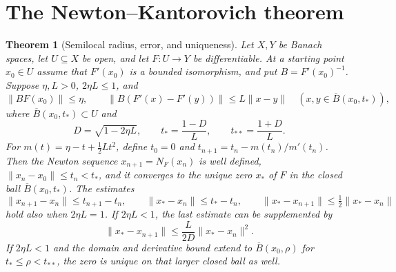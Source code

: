 \documentclass[11pt,oneside,openany]{book}
\theoremstyle{plain}
\newtheorem{theorem}{Theorem}[chapter]
\theoremstyle{definition}
\theoremstyle{remark}
\begin{document}
\section{The Newton--Kantorovich theorem}

\begin{theorem}[Semilocal radius, error, and uniqueness]\label{p206:W77}
Let \(X,Y\) be Banach spaces, let \(U\subseteq X\) be open, and
let \(F\colon U\to Y\) be differentiable. At a starting point
\(x_0\in U\) assume that \(F'(x_0)\) is a bounded isomorphism,
and put \(B=F'(x_0)^{-1}\). Suppose \(\eta,L>0\), \(2\eta L\le1\),
and
\[
 \|BF(x_0)\|\le\eta,\qquad
 \|B(F'(x)-F'(y))\|\le L\|x-y\|
 \quad (x,y\in\overline B(x_0,t_*)),
\]
where \(\overline B(x_0,t_*)\subset U\) and
\[
 D=\sqrt{1-2\eta L},\qquad
 t_*=\frac{1-D}{L},\qquad t_{**}=\frac{1+D}{L}.
\]
For \(m(t)=\eta-t+\tfrac12 Lt^2\), define
\(t_0=0\) and \(t_{n+1}=t_n-m(t_n)/m'(t_n)\).
Then the Newton sequence \(x_{n+1}=N_F(x_n)\) is well defined,
\(\|x_n-x_0\|\le t_n<t_*\), and it converges to the unique zero
\(x_*\) of \(F\) in the closed ball \(\overline B(x_0,t_*)\).
The estimates
\[
 \|x_{n+1}-x_n\|\le t_{n+1}-t_n,\qquad
 \|x_*-x_n\|\le t_*-t_n,\qquad
 \|x_*-x_{n+1}\|\le \tfrac12\|x_*-x_n\|
\]
hold also when \(2\eta L=1\). If \(2\eta L<1\), the last estimate
can be supplemented by
\[
 \|x_*-x_{n+1}\|\le\frac{L}{2D}\|x_*-x_n\|^2 .
\]
If \(2\eta L<1\) and the domain and derivative bound extend
to \(\overline B(x_0,\rho)\) for \(t_*\le\rho<t_{**}\), the zero
is unique on that larger closed ball as well.
\end{theorem}
\end{document}
